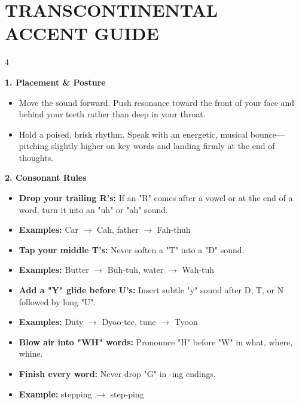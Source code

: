 \documentclass[12pt, a4paper]{article}
\begin{document}
\section*{\textbf{\large TRANSCONTINENTAL ACCENT GUIDE}}

\vspace{1cm}

\begin{multicols}{4}

\begin{minipage}{\columnwidth}
\textbf{1. Placement \& Posture}

\begin{itemize}
    \item Move the sound forward. Push resonance toward the front of your face and behind your teeth rather than deep in your throat.
    \item Hold a poised, brisk rhythm. Speak with an energetic, musical bounce—pitching slightly higher on key words and landing firmly at the end of thoughts.
\end{itemize}
\end{minipage}

\begin{minipage}{\columnwidth}
\textbf{2. Consonant Rules}

\begin{itemize}
    \item \textbf{Drop your trailing R's:} If an "R" comes after a vowel or at the end of a word, turn it into an "uh" or "ah" sound.
    \item \textbf{Examples:} Car $\rightarrow$ Cah, father $\rightarrow$ Fah-thuh
    \item \textbf{Tap your middle T's:} Never soften a "T" into a "D" sound.
    \item \textbf{Examples:} Butter $\rightarrow$ Buh-tuh, water $\rightarrow$ Wah-tuh
    \item \textbf{Add a "Y" glide before U's:} Insert subtle "y" sound after D, T, or N followed by long "U".
    \item \textbf{Examples:} Duty $\rightarrow$ Dyoo-tee, tune $\rightarrow$ Tyoon
    \item \textbf{Blow air into "WH" words:} Pronounce "H" before "W" in what, where, whine.
    \item \textbf{Finish every word:} Never drop "G" in -ing endings.
    \item \textbf{Example:} stepping $\rightarrow$ step-ping
\end{itemize}
\end{minipage}


\end{multicols}
\end{document}
